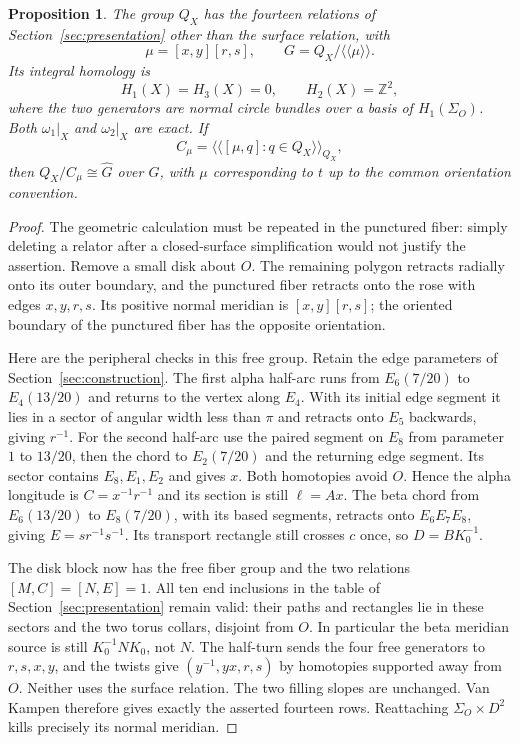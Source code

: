 \documentclass[11pt]{amsart}
\newtheorem{proposition}[theorem]{Proposition}
\theoremstyle{definition}
\theoremstyle{remark}
\newcommand{\Z}{\mathbb Z}
\newcommand{\nc}[1]{\langle\!\langle #1\rangle\!\rangle}
\begin{document}
\begin{proposition}\label{prop:exterior}
The group $Q_X$ has the fourteen relations of
Section~\ref{sec:presentation} other than the surface relation, with
\[
 \mu=[x,y][r,s],\qquad G=Q_X/\nc\mu.
\]
Its integral homology is
\[
 H_1(X)=H_3(X)=0,\qquad H_2(X)=\Z^2,
\]
where the two generators are normal circle bundles over a basis of
$H_1(\Sigma_O)$. Both $\omega_1|_X$ and $\omega_2|_X$ are exact.
If
\[
 C_\mu=\nc{[\mu,q]:q\in Q_X}_{Q_X},
\]
then $Q_X/C_\mu\cong\widehat G$ over $G$, with $\mu$ corresponding
to $t$ up to the common orientation convention.
\end{proposition}
\begin{proof}
The geometric calculation must be repeated in the punctured fiber:
simply deleting a relator after a closed-surface simplification would
not justify the assertion. Remove a small disk about $O$. The remaining
polygon retracts radially onto its outer boundary, and the punctured
fiber retracts onto the rose with edges $x,y,r,s$. Its positive
normal meridian is $[x,y][r,s]$; the oriented boundary of the punctured
fiber has the opposite orientation.

Here are the peripheral checks in this free group. Retain the edge
parameters of Section~\ref{sec:construction}. The first alpha half-arc
runs from $E_6(7/20)$ to $E_4(13/20)$ and returns to the vertex
along $E_4$. With its initial edge segment it lies in a sector of
angular width less than $\pi$ and retracts onto $E_5$ backwards,
giving $r^{-1}$. For the second half-arc use the paired segment on
$E_8$ from parameter $1$ to $13/20$, then the chord to $E_2(7/20)$
and the returning edge segment. Its sector contains $E_8,E_1,E_2$
and gives $x$. Both homotopies avoid $O$. Hence the alpha longitude
is $C=x^{-1}r^{-1}$ and its section is still $\ell=Ax$.
The beta chord from $E_6(13/20)$ to $E_8(7/20)$, with its based
segments, retracts onto $E_6E_7E_8$, giving $E=sr^{-1}s^{-1}$.
Its transport rectangle still crosses $c$ once, so $D=BK_0^{-1}$.

The disk block now has the free fiber group and the two relations
$[M,C]=[N,E]=1$. All ten end inclusions in the table of
Section~\ref{sec:presentation} remain valid: their paths and
rectangles lie in these sectors and the two torus collars, disjoint
from $O$. In particular the beta meridian source is still
$K_0^{-1}NK_0$, not $N$. The half-turn sends the four free generators
to $r,s,x,y$, and the twists give $(y^{-1},yx,r,s)$ by homotopies
supported away from $O$. Neither uses the surface relation.
The two filling slopes are unchanged. Van Kampen therefore gives
exactly the asserted fourteen rows. Reattaching
$\Sigma_O\times D^2$ kills precisely its normal meridian.


\end{proof}
\end{document}
